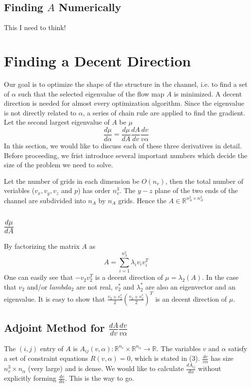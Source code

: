 \documentclass{article}
\begin{document}
\subsection{Finding $A$ Numerically}
 
This I need to think!


\section{Finding a Decent Direction}
Our goal is to optimize the shape of the structure in the channel, i.e. to find a set of $\alpha$ such that the selected eigenvalue of the flow map $A$ is minimized. A decent direction is needed for almost every optimization algorithm. Since the eigenvalue is not directly related to $\alpha$, a series of chain rule are applied to find the gradient. Let the second largest eigenvalue of $A$ be $\mu$
\begin{equation*}
 \frac{d\mu}{d\alpha} = \frac{d \mu}{d A}\frac{d A}{d v} \frac{dv}{v\alpha}
\end{equation*}
In this section, we would like to discuss each of these three derivatives in detail. Before proceeding, we frist introduce several important numbers which decide the size of the problem we need to solve. 

Let the number of grids in each dimension be $O(n_v)$, then the total number of veriables ($v_x, v_y, v_z$ and $p$) has order $n_v^3$. The $y-z$ plane of the two ends of the channel are subdivided into $n_A$ by $n_A$ grids. Hence the $A \in \mathbb{R}^{n_A^2 \times n_A^2}$    

\subsection{$\frac{d\mu}{dA}$}
By factorizing the matrix $A$ as
\begin{equation*}
 A = \sum_{i=1}^{n_A^2} \lambda_i v_iv_i^T
\end{equation*}
One can easily see that $-v_2v_2^T$ is a decent direction of $\mu = \lambda_2(A)$. In the case that $v_2$ and/or $lambda_2$ are not real, $v_2^*$ and $\lambda_2^*$ are also an eigenvector and an eigenvalue. It is easy to show that $\frac{v_2+v_2^*}{2}(\frac{v_2+v_2^*}{2})^T$ is an decent direction of $\mu$. 


\subsection{Adjoint Method for $\frac{d A}{d v} \frac{dv}{v\alpha}$ }
The $(i,j)$ entry of $A$ is $A_{ij}(v,\alpha):\mathbb{R}^{n_v} \times \mathbb{R}^{n_\alpha} \rightarrow \mathbb{R}$. The variables $v$ and $\alpha$ satisfy a set of constraint equations $R(v,\alpha)=0$, which is stated in (3). $\frac{dv}{v\alpha}$ has size $n_v^3 \times n_\alpha$ (very large) and is dense. We would like to calculate $\frac{dA_{ij}}{d\alpha}$ without explicitly forming $\frac{dv}{d\alpha}$. This is the way to go.
\end{document}
